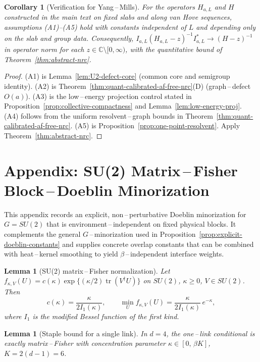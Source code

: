 \documentclass[11pt]{amsart}
\theoremstyle{plain}
\newtheorem{lemma}[theorem]{Lemma}
\newtheorem{corollary}[theorem]{Corollary}
\theoremstyle{definition}
\theoremstyle{remark}
\begin{document}
\begin{corollary}[Verification for Yang\,--\,Mills]\label{cor:nrc-ym}
For the operators $H_{a,L}$ and $H$ constructed in the main text on fixed slabs and along van Hove sequences, assumptions \emph{(A1)}--\emph{(A5)} hold with constants independent of $L$ and depending only on the slab and group data. Consequently, $I_{a,L}(H_{a,L}-z)^{-1}I_{a,L}^\ast\to (H-z)^{-1}$ in operator norm for each $z\in\mathbb C\setminus[0,\infty)$, with the quantitative bound of Theorem~\ref{thm:abstract-nrc}.
\end{corollary}
\begin{proof}
(A1) is Lemma~\ref{lem:U2-defect-core} (common core and semigroup identity). (A2) is Theorem~\ref{thm:quant-calibrated-af-free-nrc}(D) (graph\,--\,defect $O(a)$). (A3) is the low\,--\,energy projection control stated in Proposition~\ref{prop:collective-compactness} and Lemma~\ref{lem:low-energy-proj}. (A4) follows from the uniform resolvent\,--\,graph bounds in Theorem~\ref{thm:quant-calibrated-af-free-nrc}. (A5) is Proposition~\ref{prop:one-point-resolvent}. Apply Theorem~\ref{thm:abstract-nrc}.
\end{proof}
\section{Appendix: SU(2) Matrix\,–\,Fisher Block\,–\,Doeblin Minorization}\label{app:su2-doeblin}

This appendix records an explicit, non\,–\,perturbative Doeblin minorization for $G=SU(2)$ that is environment\,–\,independent on fixed physical blocks. It complements the general $G$\,–\,minorization used in Proposition~\ref{prop:explicit-doeblin-constants} and supplies concrete overlap constants that can be combined with heat\,–\,kernel smoothing to yield $\beta$\,–\,independent interface weights.

\begin{lemma}[SU(2) matrix\,–\,Fisher normalization]\label{lem:su2-mf}
Let $f_{\kappa,V}(U)=c(\kappa)\exp\{(\kappa/2)\operatorname{tr}(V^{\dagger}U)\}$ on $SU(2)$, $\kappa\ge 0$, $V\in SU(2)$. Then
\[
  c(\kappa)=\frac{\kappa}{2 I_1(\kappa)},\qquad \min_U f_{\kappa,V}(U)=\frac{\kappa}{2 I_1(\kappa)}\,e^{-\kappa},
\]
where $I_1$ is the modified Bessel function of the first kind.
\end{lemma}

\begin{lemma}[Staple bound for a single link]\label{lem:su2-kappa}
In $d=4$, the one\,–\,link conditional is exactly matrix\,–\,Fisher with concentration parameter $\kappa\in[0,\,\beta K]$, $K=2(d-1)=6$.
\end{lemma}
\end{document}
